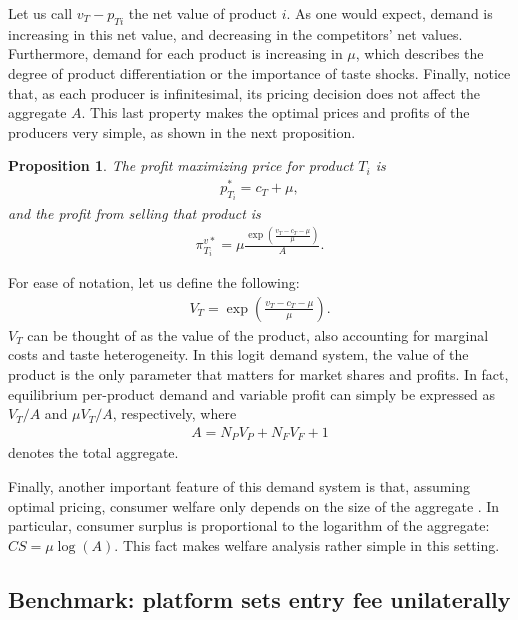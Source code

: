 \documentclass[a4paper]{article}
\newtheorem{proposition}{Proposition}
\begin{document}
Let us call $v_T - p_{Ti}$ the net value of product $i$.
As one would expect, demand is increasing in this net value, and decreasing in the competitors' net values.
Furthermore, demand for each product is increasing in $\mu$, which describes the degree of product differentiation or the importance of taste shocks.
Finally, notice that, as each producer is infinitesimal, its pricing decision does not affect the aggregate $A$.
This last property makes the optimal prices and profits of the producers very simple, as shown in the next proposition.
\begin{proposition}
    \label{prop:optimal_profit}
    The profit maximizing price for product $T_i$ is
    \begin{align*}
        p^*_{T_i} = c_T + \mu,
    \end{align*}
    and the profit from selling that product is
    \begin{align}
        \pi^{v*}_{T_i} = \mu \frac{\exp \left( \frac{v_T - c_T - \mu}{\mu} \right)}{A}.
        \label{eq:optimal_profit}
    \end{align}
\end{proposition}

For ease of notation, let us define the following:
\begin{align*}
    V_T = \exp \left( \frac{v_T - c_T - \mu}{\mu} \right).
\end{align*}
$V_T$ can be thought of as the value of the product, also accounting for marginal costs and taste heterogeneity.
In this logit demand system, the value of the product is the only parameter that matters for market shares and profits.
In fact, equilibrium per-product demand and variable profit can simply be expressed as $V_T/ A$ and $\mu V_T/ A$, respectively, where
\begin{align*}
    A = N_P V_P + N_F V_F + 1
\end{align*}
denotes the total aggregate.

Finally, another important feature of this demand system is that, assuming optimal pricing, consumer welfare only depends on the size of the aggregate \parencite{anderson2020aggregative}.
In particular, consumer surplus is proportional to the logarithm of the aggregate: $CS = \mu \log(A)$. This fact makes welfare analysis rather simple in this setting.

\subsection{Benchmark: platform sets entry fee unilaterally}
\end{document}
